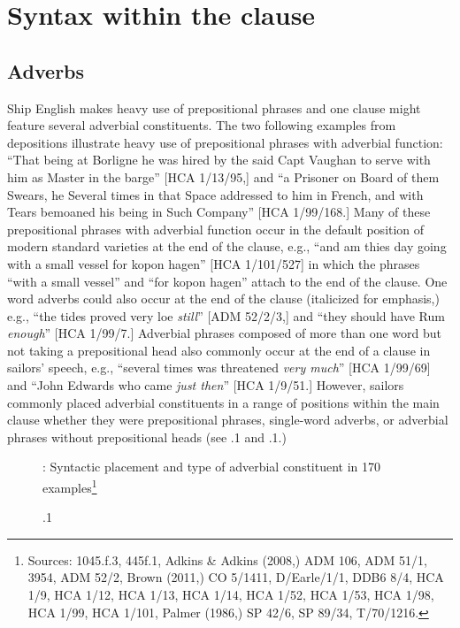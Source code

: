 \section{{Syntax} {within} {the} {clause}}%

\subsection{{Adverbs}}%

  Ship English makes heavy use of prepositional phrases and one clause might feature several adverbial constituents. The two following examples from depositions illustrate heavy use of prepositional phrases with adverbial function: “That being at Borligne he was hired by the said Capt Vaughan to serve with him as Master in the barge” [HCA 1/13/95,] and “a Prisoner on Board of them Swears, he Several times in that Space addressed to him in French, and with Tears bemoaned his being in Such Company” [HCA 1/99/168.] Many of these prepositional phrases with adverbial function occur in the default position of modern standard varieties at the end of the clause, e.g., “and am thies day going with a small vessel for kopon hagen” [HCA 1/101/527] in which the phrases “with a small vessel” and “for kopon hagen” attach to the end of the clause. One word adverbs could also occur at the end of the clause (italicized for emphasis,) e.g., “the tides proved very loe \textit{still}” [ADM 52/2/3,] and “they should have Rum \textit{enough}” [HCA 1/99/7.] Adverbial phrases composed of more than one word but not taking a prepositional head also commonly occur at the end of a clause in sailors’ speech, e.g., “several times was threatened \textit{very much}” [HCA 1/99/69] and “John Edwards who came \textit{just then}” [HCA 1/9/51.] However, sailors commonly placed adverbial constituents in a range of positions within the main clause whether they were prepositional phrases, single-word adverbs, or adverbial phrases without prepositional heads (see .1 and .1.) 

\begin{figure}
  
 

\caption{\label{fig:key:7}.1}: Syntactic placement and type of adverbial constituent in 170 examples\footnote{Sources: 1045.f.3, 445f.1, Adkins \& Adkins (2008,) ADM 106, ADM 51/1, 3954, ADM 52/2, Brown (2011,)   CO 5/1411, D/Earle/1/1, DDB6 8/4, HCA 1/9, HCA 1/12, HCA 1/13, HCA 1/14, HCA 1/52, HCA 1/53, HCA 1/98, HCA 1/99, HCA 1/101, Palmer (1986,) SP 42/6, SP 89/34, T/70/1216.}
\end{figure}

